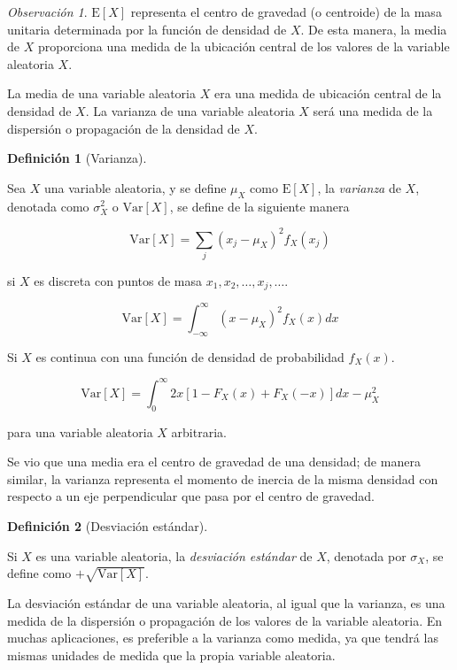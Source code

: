 \documentclass[
  letterpaper,
  DIV=11,
  numbers=noendperiod]{scrreport}
\theoremstyle{plain}
\theoremstyle{definition}
\newtheorem{definition}{Definición}[chapter]
\theoremstyle{definition}
\theoremstyle{plain}
\theoremstyle{remark}
\newtheorem*{remark}{Observación}
\begin{document}
\begin{remark}
\(\mathrm E[X]\) representa el centro de gravedad (o centroide) de la
masa unitaria determinada por la función de densidad de \(X\). De esta
manera, la media de \(X\) proporciona una medida de la ubicación central
de los valores de la variable aleatoria \(X\).
\end{remark}

La media de una variable aleatoria \(X\) era una medida de ubicación
central de la densidad de \(X\). La varianza de una variable aleatoria
\(X\) será una medida de la dispersión o propagación de la densidad de
\(X\).

\begin{definition}[Varianza]\protect\hypertarget{def-var}{}\label{def-var}

Sea \(X\) una variable aleatoria, y se define \(\mu_X\) como
\(\mathrm E[X]\), la \emph{varianza} de \(X\), denotada como
\(\sigma_X^2\) o \(\mathrm{Var}[X]\), se define de la siguiente manera

\[ \mathrm{Var}[X]= \sum_j (x_j-\mu_X)^2 f_X(x_j) \]

si \(X\) es discreta con puntos de masa
\(x_1, x_2, \ldots, x_j, \ldots\).

\[ \mathrm{Var}[X]=\int_{-\infty}^\infty (x-\mu_X)^2f_X(x)dx \]

Si \(X\) es continua con una función de densidad de probabilidad
\(f_X(x)\).

\[ \mathrm{Var}[X]=\int_0^\infty 2x[1-F_X(x)+F_X(-x)]dx - \mu_X^2 \]

para una variable aleatoria \(X\) arbitraria.

\end{definition}

Se vio que una media era el centro de gravedad de una densidad; de
manera similar, la varianza representa el momento de inercia de la misma
densidad con respecto a un eje perpendicular que pasa por el centro de
gravedad.

\begin{definition}[Desviación
estándar]\protect\hypertarget{def-SD}{}\label{def-SD}

Si \(X\) es una variable aleatoria, la \emph{desviación estándar} de
\(X\), denotada por \(\sigma_X\), se define como
\(+\sqrt{\mathrm{Var}[X]}\).

\end{definition}

La desviación estándar de una variable aleatoria, al igual que la
varianza, es una medida de la dispersión o propagación de los valores de
la variable aleatoria. En muchas aplicaciones, es preferible a la
varianza como medida, ya que tendrá las mismas unidades de medida que la
propia variable aleatoria.
\end{document}
